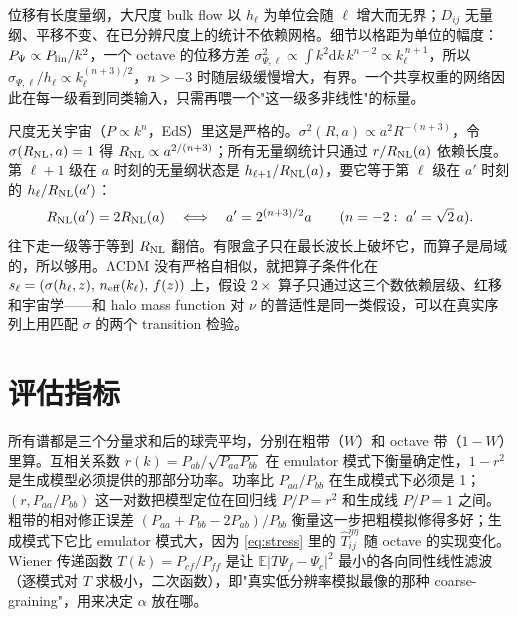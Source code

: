 \documentclass[11pt,UTF8,fontset=none]{ctexart}
\newcommand{\E}{\mathbb{E}}
\newcommand{\dd}{\mathrm{d}}
\begin{document}
位移有长度量纲，大尺度 bulk flow 以 $h_\ell$ 为单位会随 $\ell$ 增大而无界；$D_{ij}$ 无量纲、平移不变、在已分辨尺度上的统计不依赖网格。细节以格距为单位的幅度：$P_\Psi\propto P_{\rm lin}/k^2$，一个 octave 的位移方差 $\sigma^2_{\Psi,\ell}\propto\int k^2\dd k\,k^{n-2}\propto k_\ell^{\,n+1}$，所以 $\sigma_{\Psi,\ell}/h_\ell\propto k_\ell^{(n+3)/2}$，$n>-3$ 时随层级缓慢增大，有界。一个共享权重的网络因此在每一级看到同类输入，只需再喂一个"这一级多非线性"的标量。

尺度无关宇宙（$P\propto k^n$，EdS）里这是严格的。$\sigma^2(R,a)\propto a^2R^{-(n+3)}$，令 $\sigma(R_{\rm NL},a)=1$ 得 $R_{\rm NL}\propto a^{2/(n+3)}$；所有无量纲统计只通过 $r/R_{\rm NL}(a)$ 依赖长度。第 $\ell+1$ 级在 $a$ 时刻的无量纲状态是 $h_{\ell+1}/R_{\rm NL}(a)$，要它等于第 $\ell$ 级在 $a'$ 时刻的 $h_\ell/R_{\rm NL}(a')$：
\begin{equation}
R_{\rm NL}(a')=2R_{\rm NL}(a)\quad\Longleftrightarrow\quad a'=2^{(n+3)/2}a\qquad(n=-2:\ a'=\sqrt2\,a).
\end{equation}
往下走一级等于等到 $R_{\rm NL}$ 翻倍。有限盒子只在最长波长上破坏它，而算子是局域的，所以够用。ΛCDM 没有严格自相似，就把算子条件化在 $s_\ell=(\sigma(h_\ell,z),\,n_{\rm eff}(k_\ell),\,f(z))$ 上，假设 $2\times$ 算子只通过这三个数依赖层级、红移和宇宙学——和 halo mass function 对 $\nu$ 的普适性是同一类假设，可以在真实序列上用匹配 $\sigma$ 的两个 transition 检验。

\section{评估指标}

所有谱都是三个分量求和后的球壳平均，分别在粗带（$W$）和 octave 带（$1-W$）里算。互相关系数 $r(k)=P_{ab}/\sqrt{P_{aa}P_{bb}}$ 在 emulator 模式下衡量确定性，$1-r^2$ 是生成模型必须提供的那部分功率。功率比 $P_{aa}/P_{bb}$ 在生成模式下必须是 1；$(r,P_{aa}/P_{bb})$ 这一对数把模型定位在回归线 $P/P=r^2$ 和生成线 $P/P=1$ 之间。粗带的相对修正误差 $(P_{aa}+P_{bb}-2P_{ab})/P_{bb}$ 衡量这一步把粗模拟修得多好；生成模式下它比 emulator 模式大，因为 \eqref{eq:stress} 里的 $\hat T^{\eta\eta}_{ij}$ 随 octave 的实现变化。Wiener 传递函数 $T(k)=P_{cf}/P_{ff}$ 是让 $\E|T\Psi_f-\Psi_c|^2$ 最小的各向同性线性滤波（逐模式对 $T$ 求极小，二次函数），即"真实低分辨率模拟最像的那种 coarse-graining"，用来决定 $\alpha$ 放在哪。

\end{document}
